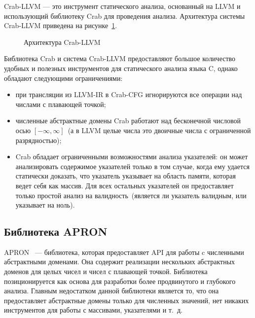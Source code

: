 Crab-LLVM --- это инструмент статического анализа, основанный на LLVM и 
использующий библиотеку Crab для проведения анализа. Архитектура системы 
Crab-LLVM приведена на рисунке~\ref{image:crabArchitecture}.
\begin{figure}[h!]
\caption{Архитектура Crab-LLVM}
\label{image:crabArchitecture}
\end{figure}

Библиотека Crab и система Crab-LLVM предоставляют большое количество удобных
и полезных инструментов для статического анализа языка C, однако обладают 
следующими ограничениями:
\begin{itemize}
\item при трансляции из LLVM-IR в Crab-CFG игнорируются все операции над 
числами с плавающей точкой;
\item численные абстрактные домены Crab работают над бесконечной числовой 
осью $[-\infty, \infty]$~(а в LLVM целые числа это двоичные числа с 
ограниченной разрядностью);
\item Crab обладает ограниченными возможностями анализа указателей: он может
анализировать содержимое указателей только в том случае, когда ему удается 
статически доказать, что указатель указывает на область памяти, которая ведет 
себя как массив. Для всех остальных указателей он предоставляет только простой
анализ на валидность~(является ли указатель валидным, или указывает на ноль).
\end{itemize}

\subsection{Библиотека APRON}
APRON~\cite{apron} --- библиотека, которая предоставляет API для работы 
c численными абстрактными доменами. Она содержит реализации нескольких
абстрактных доменов для целых чисел и чисел с плавающей точкой. Библиотека 
позиционируется как основа для разработки более продвинутого и глубокого 
анализа. Главным недостатком данной библиотеки является то, что она предоставляет
абстрактные домены только для численных значений, нет никаких 
инструментов для работы с массивами, указателями и т.~д.

